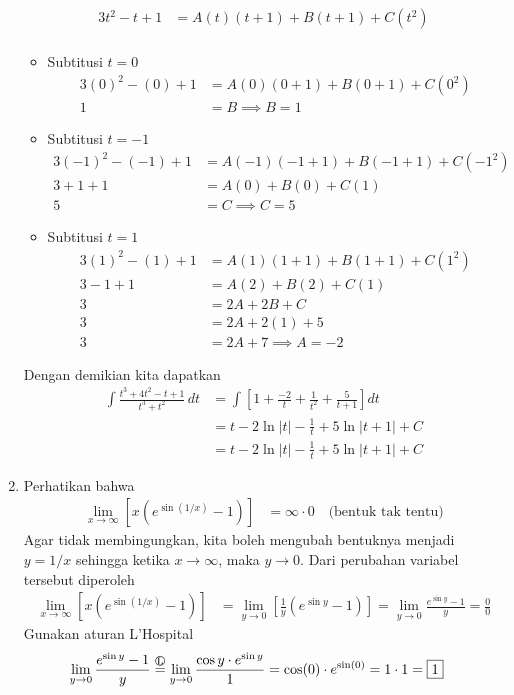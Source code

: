 \documentclass[11pt,openany,a4paper]{article}
\newcommand{\Hrule}{\stackrel{\text{\raisebox{1.5pt}{\textcircled{\raisebox{-.9pt} {L}}}}}{=}}
\begin{document}
\begin{enumerate}
\begin{align*}
          3t^2 - t + 1 &= A(t)(t + 1) + B(t + 1) + C(t^2) \\
        \end{align*}
        \begin{itemize}
          \item Subtitusi $t=0$
          \begin{align*}
            3(0)^2 - (0) + 1 &= A(0)(0 + 1) + B(0 + 1) + C(0^2) \\
            1 &= B \implies B = 1
          \end{align*}
          \item Subtitusi $t=-1$
          \begin{align*}
            3(-1)^2 - (-1) + 1 &= A(-1)(-1 + 1) + B(-1 + 1) + C(-1^2) \\
            3 + 1 + 1 &= A(0) + B(0) + C(1) \\
            5 &= C \implies C = 5
          \end{align*}
          \item Subtitusi $t=1$
          \begin{align*}
            3(1)^2 - (1) + 1 &= A(1)(1 + 1) + B(1 + 1) + C(1^2) \\
            3 - 1 + 1 &= A(2) + B(2) + C(1) \\
            3 &= 2A + 2B + C \\
            3 &= 2A + 2(1) + 5 \\
            3 &= 2A + 7 \implies A = -2
          \end{align*}
        \end{itemize}
        Dengan demikian kita dapatkan
        \begin{align*}
          \int \frac{t^3 + 4t^2 - t + 1}{t^3 + t^2} \, dt &= \int \left[1 + \frac{-2}{t} + \frac{1}{t^2} + \frac{5}{t + 1}\right]dt \\
          &= t - 2\ln|t| - \frac{1}{t} + 5\ln|t + 1| + C \\
          &= \boxed{t - 2\ln|t| - \frac{1}{t} + 5\ln|t + 1| + C}
        \end{align*}
        \item Perhatikan bahwa
        \begin{align*}
          \lim_{x \to \infty} \left[ x \left( e^{\sin(1/x)} - 1 \right) \right] &= \infty\cdot 0 \quad\text{(bentuk tak tentu)}
        \end{align*}
        Agar tidak membingungkan, kita boleh mengubah bentuknya menjadi $y=1/x$ sehingga ketika $x \to \infty$, maka $y \to 0$. Dari perubahan variabel tersebut diperoleh
        \begin{align*}
          \lim_{x \to \infty} \left[ x \left( e^{\sin(1/x)} - 1 \right) \right] &= \lim_{y \to 0} \left[ \frac{1}{y} \left( e^{\sin y} - 1 \right) \right] 
          = \lim_{y \to 0} \frac{e^{\sin y} - 1}{y} = \frac{0}{0}
        \end{align*}
        Gunakan aturan L'Hospital
        \begin{align*}
          \lim_{y \to 0} \frac{e^{\sin y} - 1}{y} &\Hrule \lim_{y \to 0} \frac{\cos y \cdot e^{\sin y}}{1} = \cos(0) \cdot e^{\sin(0)} = 1 \cdot 1 = \boxed{1}
        \end{align*}
    \end{enumerate}
    
\end{document}
